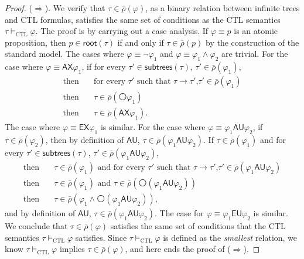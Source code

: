 \documentclass[acmsmall]{acmart}
\newcommand{\barrho}{\bar{\rho}}
\newcommand{\wnext}{{\medcirc}}
\newcommand{\AX}{\mathsf{AX}}
\newcommand{\AU}{\mathbin{\mathsf{AU}}}
\newcommand{\EU}{\mathbin{\mathsf{EU}}}
\newcommand{\EX}{\mathsf{EX}}
\newcommand{\rt}{\mathsf{root}}
\newcommand{\subtrees}{\mathsf{subtrees}}
\newcommand{\textthen}{\text{then}}
\newcommand{\CTL}{\mathrm{CTL}}
\begin{document}
\begin{proof}
($\Longrightarrow$).
We verify that $\tau \in \barrho(\varphi)$, as a binary relation
between infinite trees and CTL formulas, satisfies 
the same set of conditions as the CTL semantics
$\tau \vDash_\CTL \varphi$.
The proof is by carrying out a case analysis.
If $\varphi \equiv p$ is an atomic proposition,
then
$p \in \rt(\tau)$ if and only if $\tau \in \barrho(p)$
by the construction of the standard model.
The cases where $\varphi \equiv \neg \varphi_1$
and $\varphi \equiv \varphi_1 \wedge \varphi_2$ are trivial.
For the case where $\varphi \equiv \AX \varphi_1$,
if for every $\tau' \in \subtrees(\tau)$,
$\tau' \in \barrho(\varphi_1)$,
\begin{align*}
\textthen\quad &
\text{
for every $\tau'$ such that $\tau \to \tau'$,
$\tau' \in \barrho(\varphi_1)$
}
\\
\textthen\quad &
\text{$\tau \in \barrho(\wnext \varphi_1)$
}
\\
\textthen\quad &
\text{$\tau \in \barrho(\AX \varphi_1)$.
}
\end{align*}
The case where $\varphi \equiv \EX \varphi_1$ is similar.
For the case where $\varphi \equiv \varphi_1 \AU \varphi_2$,
if $\tau \in \barrho(\varphi_2)$,
then by definition of $\AU$,
$\tau \in \barrho(\varphi_1 \AU \varphi_2)$.
If $\tau \in \barrho(\varphi_1)$ and
for every $\tau' \in \subtrees(\tau)$,
$\tau' \in \barrho(\varphi_1 \AU \varphi_2)$,
\begin{align*}
\textthen \quad &
\text{
$\tau \in \barrho(\varphi_1)$ and 
for every $\tau'$ such that $\tau \to \tau'$,
$\tau' \in 
 \barrho(\varphi_1 \AU \varphi_2)$
}
\\
\textthen\quad &
\text{
$\tau \in \barrho(\varphi_1)$ and 
$\tau \in \barrho(\wnext (\varphi_1 \AU \varphi_2))$
}
\\
\textthen\quad &
\text{
$\tau \in \barrho(\varphi_1 \wedge \wnext (\varphi_1 \AU \varphi_2))$
},
\end{align*}
and by definition of $\AU$, 
$\tau \in \barrho(\varphi_1 \AU \varphi_2)$.
The case for $\varphi \equiv \varphi_1 \EU \varphi_2$ is similar.
We conclude that $\tau \in \barrho(\varphi)$ satisfies the
same set of conditions that the CTL semantics
$\tau \vDash_\CTL \varphi$ satisfies.
Since $\tau \vDash_\CTL \varphi$ is defined as the \emph{smallest}
relation, we know $\tau \vDash_\CTL \varphi$ implies
$\tau \in \barrho(\varphi)$, and here ends the proof of ($\Longrightarrow$).


\end{proof}
\end{document}
